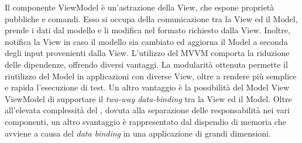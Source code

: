 			Il componente ViewModel è un'astrazione della View, che espone proprietà pubbliche e comandi. Esso si occupa della comunicazione tra la View ed il Model, prende i dati dal modello e li modifica nel formato richiesto dalla View. Inoltre, notifica la View in caso il modello sia cambiato ed aggiorna il Model a seconda degli input provenienti dalla View.
		L'utilizzo del  MVVM comporta la riduzione delle dipendenze, offrendo diversi vantaggi. La modularità ottenuta permette il riutilizzo del Model in applicazioni con diverse View, oltre a rendere più semplice e rapida l'esecuzione di test. 
		Un altro vantaggio è la possibilità del Model View ViewModel di supportare il \textit{two-way data-binding} tra la View ed il Model.
		Oltre all'elevata complessità del , dovuta alla separazione delle responsabilità nei vari componenti, un altro svantaggio è rappresentato dal dispendio di memoria che avviene a causa del \textit{data binding} in una applicazione di grandi dimensioni.


